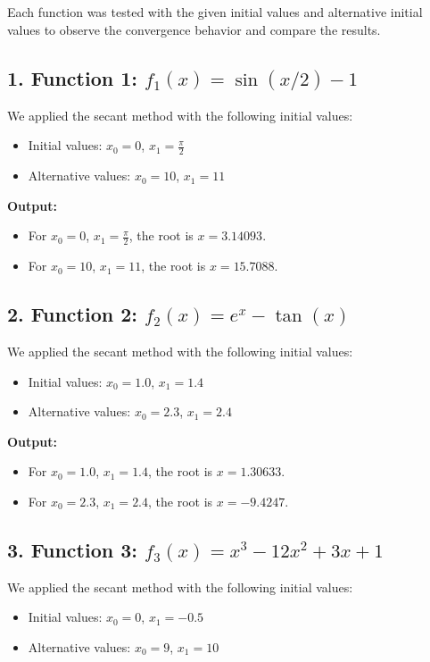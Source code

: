 \documentclass[a4paper]{article}
\begin{document}
Each function was tested with the given initial values and alternative initial values to observe the convergence behavior and compare the results.

\subsection*{1. Function 1: \( f_1(x) = \sin(x/2) - 1 \)}

We applied the secant method with the following initial values:
\begin{itemize}
    \item Initial values: \(x_0 = 0\), \(x_1 = \frac{\pi}{2}\)
    \item Alternative values: \(x_0 = 10\), \(x_1 = 11\)
\end{itemize}

\textbf{Output:}
\begin{itemize}
    \item For \(x_0 = 0\), \(x_1 = \frac{\pi}{2}\), the root is \(x = 3.14093\).
    \item For \(x_0 = 10\), \(x_1 = 11\), the root is \(x = 15.7088\).
\end{itemize}

\subsection*{2. Function 2: \( f_2(x) = e^x - \tan(x) \)}

We applied the secant method with the following initial values:
\begin{itemize}
    \item Initial values: \(x_0 = 1.0\), \(x_1 = 1.4\)
    \item Alternative values: \(x_0 = 2.3\), \(x_1 = 2.4\)
\end{itemize}

\textbf{Output:}
\begin{itemize}
    \item For \(x_0 = 1.0\), \(x_1 = 1.4\), the root is \(x = 1.30633\).
    \item For \(x_0 = 2.3\), \(x_1 = 2.4\), the root is \(x = -9.4247\).
\end{itemize}

\subsection*{3. Function 3: \( f_3(x) = x^3 - 12x^2 + 3x + 1 \)}

We applied the secant method with the following initial values:
\begin{itemize}
    \item Initial values: \(x_0 = 0\), \(x_1 = -0.5\)
    \item Alternative values: \(x_0 = 9\), \(x_1 = 10\)
\end{itemize}
\end{document}
